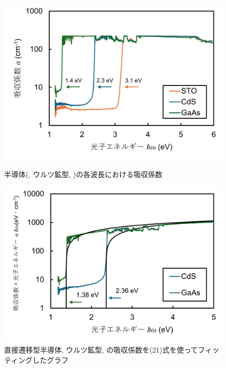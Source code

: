 \documentclass[11pt,dvipdfmx,a4paper]{jsarticle}
\begin{document}
\begin{figure}[H]
    \begin{minipage}[t]{0.48\columnwidth}
        \centering
        \includegraphics[width = \columnwidth]{graph/graph3.png}
        \caption{半導体(, ウルツ鉱型, )の各波長における吸収係数}
        \label{graph:03}
    \end{minipage}
    \hfil
    \begin{minipage}[t]{0.48\columnwidth}
        \centering
        \includegraphics[width = \columnwidth]{graph/graph5.png}
        \caption{直接遷移型半導体, ウルツ鉱型, の吸収係数を(21)式を使ってフィッティングしたグラフ}
        \label{graph:05}
    \end{minipage}
\end{figure}
\end{document}
